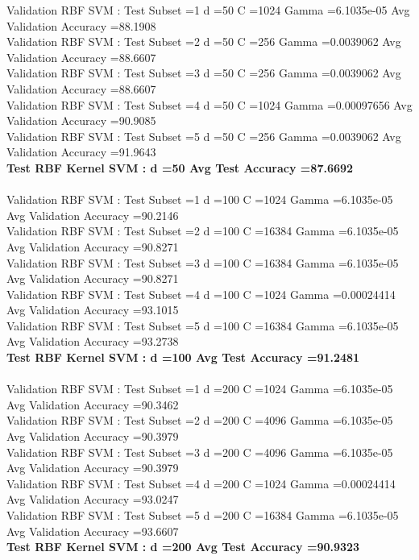 \documentclass[paper=a4, fontsize=11pt]{scrartcl} %
\numberwithin{equation}{section} %
\numberwithin{figure}{section} %
\numberwithin{table}{section} %
\begin{document}
Validation RBF SVM : Test Subset =1 d =50 C =1024 Gamma =6.1035e-05 Avg Validation Accuracy =88.1908\\
Validation RBF SVM : Test Subset =2 d =50 C =256 Gamma =0.0039062 Avg Validation Accuracy =88.6607\\
Validation RBF SVM : Test Subset =3 d =50 C =256 Gamma =0.0039062 Avg Validation Accuracy =88.6607\\
Validation RBF SVM : Test Subset =4 d =50 C =1024 Gamma =0.00097656 Avg Validation Accuracy =90.9085\\
Validation RBF SVM : Test Subset =5 d =50 C =256 Gamma =0.0039062 Avg Validation Accuracy =91.9643\\
\textbf{Test RBF Kernel SVM : d =50 Avg Test Accuracy =87.6692}\\\\

Validation RBF SVM : Test Subset =1 d =100 C =1024 Gamma =6.1035e-05 Avg Validation Accuracy =90.2146\\
Validation RBF SVM : Test Subset =2 d =100 C =16384 Gamma =6.1035e-05 Avg Validation Accuracy =90.8271\\
Validation RBF SVM : Test Subset =3 d =100 C =16384 Gamma =6.1035e-05 Avg Validation Accuracy =90.8271\\
Validation RBF SVM : Test Subset =4 d =100 C =1024 Gamma =0.00024414 Avg Validation Accuracy =93.1015\\
Validation RBF SVM : Test Subset =5 d =100 C =16384 Gamma =6.1035e-05 Avg Validation Accuracy =93.2738\\
\textbf{Test RBF Kernel SVM : d =100 Avg Test Accuracy =91.2481}\\\\

Validation RBF SVM : Test Subset =1 d =200 C =1024 Gamma =6.1035e-05 Avg Validation Accuracy =90.3462\\
Validation RBF SVM : Test Subset =2 d =200 C =4096 Gamma =6.1035e-05 Avg Validation Accuracy =90.3979\\
Validation RBF SVM : Test Subset =3 d =200 C =4096 Gamma =6.1035e-05 Avg Validation Accuracy =90.3979\\
Validation RBF SVM : Test Subset =4 d =200 C =1024 Gamma =0.00024414 Avg Validation Accuracy =93.0247\\
Validation RBF SVM : Test Subset =5 d =200 C =16384 Gamma =6.1035e-05 Avg Validation Accuracy =93.6607\\
\textbf{Test RBF Kernel SVM : d =200 Avg Test Accuracy =90.9323}
\end{document}
